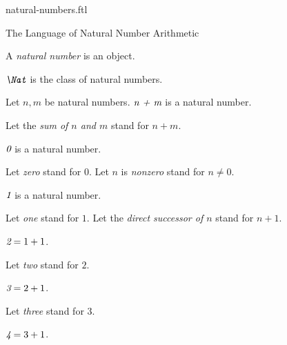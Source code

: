 \documentclass{naproche-library}
\begin{document}
\begin{smodule}[title=Natural Numbers]{natural-numbers.ftl}

\begin{sfragment}{The Language of Natural Number Arithmetic}
  \begin{signature}[forthel,id=ARITHMETIC_01_3074681254969344]
    A \emph{natural number} is an object.
  \end{signature}

  \begin{definition}[forthel,id=ARITHMETIC_01_7367148418629632]
    $\emph{\Nat}$ is the class of natural numbers.
  \end{definition}

  \begin{signature}[forthel,id=ARITHMETIC_01_1567933815848960]
    Let $n, m$ be natural numbers.
    $\emph{n + m}$ is a natural number.

    Let the \emph{sum of $n$ and $m$} stand for $n + m$.
  \end{signature}

  \begin{signature}[forthel,id=ARITHMETIC_01_7633304715001856]
    $\emph{0}$ is a natural number.

    Let \emph{zero} stand for $0$.
    Let $n$ is \emph{nonzero} stand for $n \neq 0$.
  \end{signature}

  \begin{signature}[forthel,id=ARITHMETIC_01_1200254566985232]
    $\emph{1}$ is a natural number.

    Let \emph{one} stand for $1$.
    Let the \emph{direct successor of $n$} stand for $n + 1$.
  \end{signature}

  \begin{definition}[forthel,id=ARITHMETIC_01_4584236572999680]
    $\emph{2} = 1 + 1$.

    Let \emph{two} stand for $2$.
  \end{definition}

  \begin{definition}[forthel,id=ARITHMETIC_01_3836725109456896]
    $\emph{3} = 2 + 1$.

    Let \emph{three} stand for $3$.
  \end{definition}

  \begin{definition}[forthel,id=ARITHMETIC_01_1709884968009728]
    $\emph{4} = 3 + 1$.


\end{definition}
\end{sfragment}
\end{smodule}
\end{document}

